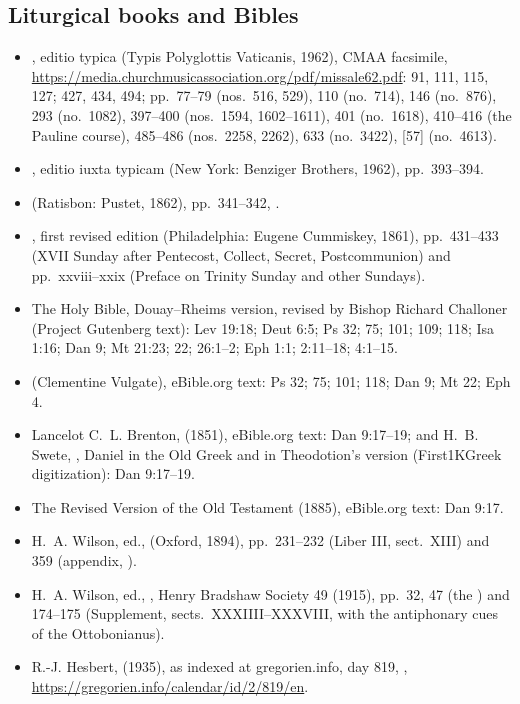 {\footnotesize
\subsection*{Liturgical books and Bibles}
\begin{itemize}
\item {}, editio typica (Typis Polyglottis Vaticanis, 1962), CMAA facsimile, \url{https://media.churchmusicassociation.org/pdf/missale62.pdf}:  91, 111, 115, 127;  427, 434, 494; pp.~77--79 (nos.~516, 529), 110 (no.~714), 146 (no.~876), 293 (no.~1082), 397--400 (nos.~1594, 1602--1611), 401 (no.~1618), 410--416 (the Pauline course), 485--486 (nos.~2258, 2262), 633 (no.~3422), [57] (no.~4613).
\item {}, editio iuxta typicam (New York: Benziger Brothers, 1962), pp.~393--394.
\item {} (Ratisbon: Pustet, 1862), pp.~341--342, .
\item {}, first revised edition (Philadelphia: Eugene Cummiskey, 1861), pp.~431--433 (XVII Sunday after Pentecost, Collect, Secret, Postcommunion) and pp.~xxviii--xxix (Preface on Trinity Sunday and other Sundays).
\item The Holy Bible, Douay--Rheims version, revised by Bishop Richard Challoner (Project Gutenberg text): Lev 19:18; Deut 6:5; Ps 32; 75; 101; 109; 118; Isa 1:16; Dan 9; Mt 21:23; 22; 26:1--2; Eph 1:1; 2:11--18; 4:1--15.
\item {} (Clementine Vulgate), eBible.org text: Ps 32; 75; 101; 118; Dan 9; Mt 22; Eph 4.
\item Lancelot C.~L. Brenton,  (1851), eBible.org text: Dan 9:17--19; and H.~B. Swete, , Daniel in the Old Greek and in Theodotion's version (First1KGreek digitization): Dan 9:17--19.
\item The Revised Version of the Old Testament (1885), eBible.org text: Dan 9:17.
\item H.~A. Wilson, ed.,  (Oxford, 1894), pp.~231--232 (Liber III, sect.~XIII) and 359 (appendix, ).
\item H.~A. Wilson, ed., , Henry Bradshaw Society 49 (1915), pp.~32, 47 (the ) and 174--175 (Supplement, sects.~XXXIIII--XXXVIII, with the antiphonary cues of the Ottobonianus).
\item R.-J. Hesbert,  (1935), as indexed at gregorien.info, day 819, , \url{https://gregorien.info/calendar/id/2/819/en}.
\end{itemize}

}
